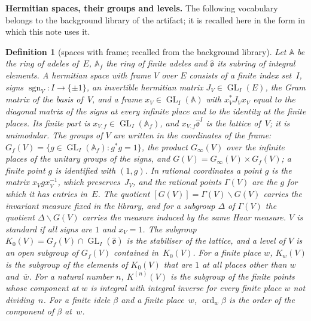\documentclass[11pt,a4paper]{article}
\newcommand{\m}[1]{\mbox{$#1$}}        %
\newcommand{\subhead}[1]{\par\addvspace{9pt plus 2pt}\Needspace{4\baselineskip}\noindent\textbf{#1}\enspace\ignorespaces}
\theoremstyle{plainx}
\theoremstyle{uprightx}
\newtheorem{definition}[theorem]{Definition}
\newcommand{\Ad}{\mathbb{A}}
\newcommand{\Af}{\mathbb{A}_f}
\newcommand{\Oh}{\hat{\mathfrak{o}}}
\newcommand{\cj}[1]{\overline{#1}}
\newcommand{\ord}{\operatorname{ord}}
\newcommand{\GL}{\operatorname{GL}}
\newcommand{\sgn}{\operatorname{sgn}}
\newcommand{\Kaw}[2]{K^{(#1)}(#2)}                 %
\newcommand{\Kz}[1]{K_0(#1)}                       %
\newcommand{\Kw}[2]{K_{#2}(#1)}                    %
\begin{document}
\subhead{Hermitian spaces, their groups and levels.} The following vocabulary belongs to the background library
of the artifact; it is recalled here in the form in which this note uses it.

\begin{definition}[spaces with frame; recalled from the background library]\label{d:space}
Let $\Ad$ be the ring of adeles of~$E$, $\Af$ the ring of finite adeles and $\Oh$ its subring of integral elements.
A \emph{hermitian space with frame} $V$ over $E$ consists of a finite index set~$I$, signs $\sgn_V\colon I\to\{\pm1\}$,
an invertible hermitian matrix \m{J_V\in\GL_I(E)}, the Gram matrix of the basis of~$V$, and a \emph{frame}
\m{x_V\in\GL_I(\Ad)} with \m{x_V^{*}J_Vx_V} equal to the diagonal matrix of the signs at every infinite place and to
the identity at the finite places. Its finite part is \m{x_{V,f}\in\GL_I(\Af)}, and \m{x_{V,f}\Oh^{I}} is the
\emph{lattice} of~$V$; it is unimodular. The groups of $V$ are written in the coordinates of the frame:
\m{G_f(V)=\{g\in\GL_I(\Af):g^{*}g=1\}}, the product $G_\infty(V)$ over the infinite places of the unitary groups of
the signs, and \m{G(V)=G_\infty(V)\times G_f(V)}; a finite point $g$ is identified with \m{(1,g)}. In
\emph{rational coordinates} a point $g$ is the matrix \m{x_Vgx_V^{-1}}, which preserves~$J_V$, and the
\emph{rational points} $\Gamma(V)$ are the $g$ for which it has entries in~$E$. The quotient \m{[G(V)]=\Gamma(V)\backslash G(V)}
carries the invariant measure fixed in the library, and for a subgroup $\Delta$ of $\Gamma(V)$ the quotient
\m{\Delta\backslash G(V)} carries the measure induced by the same Haar measure. $V$ is \emph{standard} if all signs
are $1$ and \m{x_V=1}. The subgroup \m{\Kz{V}=G_f(V)\cap\GL_I(\Oh)} is the stabiliser of the lattice, and a
\emph{level} of $V$ is an open subgroup of $G_f(V)$ contained in~$\Kz{V}$. For a finite place $w$, $\Kw{V}{w}$ is the
subgroup of the elements of $\Kz{V}$ that are $1$ at all places other than $w$ and~$\cj w$. For a natural number
$n$, \m{\Kaw{n}{V}} is the subgroup of the finite points whose component at $w$ is integral with integral inverse
for every finite place $w$ not dividing~$n$. For a finite idele $\beta$ and a finite place~$w$, $\ord_w\beta$ is the
order of the component of $\beta$ at~$w$.
\end{definition}
\end{document}
